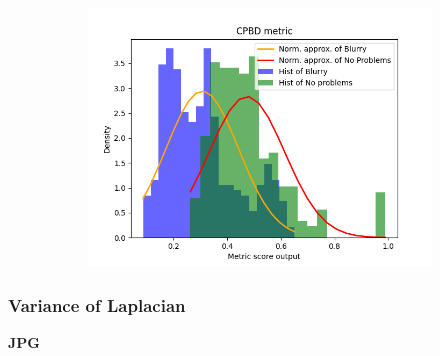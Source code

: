 \begin{figure}[H]
\begin{subfigure}[t]{0.48\textwidth}
        \caption{}
        \label{fig:CPBD_thresh}
    \end{subfigure}\hspace{1em}
    \begin{subfigure}[t]{0.48\textwidth}
        \includegraphics[width=\textwidth]{Figures/BlurredImages/results_on_thresholds/output_dens_cpbd.png}
        \caption{}
        \label{fig:CPBD_dens}
    \end{subfigure}\hspace{1em}
    \caption{}
    \label{fig:CPBD_final}
\end{figure}

\subsubsection{Variance of Laplacian}
\textbf{JPG}\\

